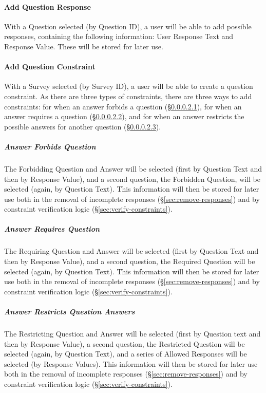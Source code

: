 \documentclass[10pt,letter]{report}
\def\hl#1{#1}
\begin{document}
\paragraph{Add Question Response}
\label{sec:add-quest-resp}

With a Question selected (by Question ID), a user will be able to add
possible responses, containing the following information: \hl{User
Response Text} and \hl{Response Value}.  These will be stored for later use.

\paragraph{Add Question Constraint}
\label{sec:add-quest-constr}

With a Survey selected (by Survey ID), a user will be able to create a
question constraint.  As there are three types of constraints, there
are three ways to add constraints: for when an answer \hl{forbids a
question} (\S\ref{sec:answ-forb-quest}), for when an answer \hl{requires a
question} (\S\ref{sec:answ-requ-quest}), and for when an \hl{answer
restricts the possible answers for another question}
(\S\ref{sec:answ-restr-quest}).

\subparagraph{Answer Forbids Question}
\label{sec:answ-forb-quest}

The Forbidding Question and Answer will be selected (first by Question
Text and then by Response Value), and a second question, the Forbidden
Question, will be selected (again, by Question Text).  This
information will then be stored for later use both in the removal of
incomplete responses (\S \ref{sec:remove-responses}) and by constraint
verification logic (\S \ref{sec:verify-constraints}).

\subparagraph{Answer Requires Question}
\label{sec:answ-requ-quest}

The Requiring Question and Answer will be selected (first by Question
Text and then by Response Value), and a second question, the Required
Question will be selected (again, by Question Text).  This information
will then be stored for later use both in the removal of incomplete
responses (\S \ref{sec:remove-responses}) and by constraint
verification logic (\S \ref{sec:verify-constraints}).

\subparagraph{Answer Restricts Question Answers}
\label{sec:answ-restr-quest}

The Restricting Question and Answer will be selected (first by
Question text and then by Response Value), a second question, the
Restricted Question will be selected (again, by Question Text), and a
series of Allowed Responses will be selected (by Response Values).
This information will then be stored for later use both in the removal
of incomplete responses (\S\ref{sec:remove-responses}) and by
constraint verification logic (\S \ref{sec:verify-constraints}).
\end{document}

